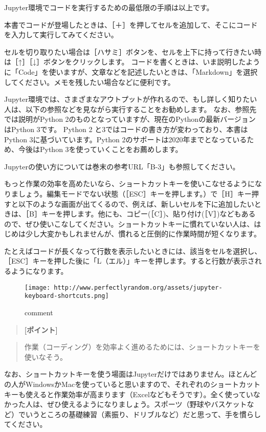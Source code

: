 \documentclass[11pt]{article}
\makeatletter
\def\maxwidth{\ifdim\Gin@nat@width>\linewidth\linewidth
    \else\Gin@nat@width\fi}
\let\Oldincludegraphics\includegraphics
\renewcommand{\includegraphics}[1]{\Oldincludegraphics[width=.8\maxwidth]{#1}}
\makeatother
\begin{document}
    Jupyter環境でコードを実行するための最低限の手順は以上です。

本書でコードが登場したときは、［＋］を押してセルを追加して、そこにコードを入力して実行してみてください。

セルを切り取りたい場合は［ハサミ］ボタンを、セルを上下に持って行きたい時は［↑］［↓］ボタンをクリックします。
コードを書くときは、いま説明したように「Code」を使いますが、文章などを記述したいときは、「Markdown」を選択してください。メモを残したい場合などに便利です。

Jupyter環境では、さまざまなアウトプットが作れるので、もし詳しく知りたい人は、以下の参照などを見ながら実行することをお勧めします。
なお、参照先では説明がPython
2のものとなっていますが、現在のPythonの最新バージョンはPython 3です。
Python 2 と3ではコードの書き方が変わっており、本書はPython
3に基づいています。Python
2のサポートは2020年までとなっているため、今後はPython
3を使っていくことをお薦めします。

Jupyterの使い方については巻末の参考URL「B-3」も参照してください。

    もっと作業の効率を高めたいなら、ショートカットキーを使いこなせるようになりましょう。編集モードでない状態（［ESC］キーを押します。）で［H］キー押すと以下のような画面が出てくるので、例えば、新しいセルを下に追加したいときは、［B］キーを押します。他にも、コピー(［C］)、貼り付け(［V］)などもあるので、ぜひ使いこなしてください。ショートカットキーに慣れていない人は、はじめは少し大変かもしれませんが、慣れると圧倒的に作業時間が短くなります。

たとえばコードが長くなって行数を表示したいときには、該当をセルを選択し、［ESC］キーを押した後に「L（エル）」キーを押します。すると行数が表示されるようになります。

    \begin{figure}
\centering
\texttt{[image: http://www.perfectlyrandom.org/assets/jupyter-keyboard-shortcuts.png]}
\caption{comment}
\end{figure}

    \begin{quote}
\textbf{{[}ポイント{]}}
\end{quote}

\begin{quote}
作業（コーディング）を効率よく進めるためには、ショートカットキーを使いなそう。
\end{quote}

    なお、ショートカットキーを使う場面はJupyterだけではありません。ほとんどの人がWindowsかMacを使っていると思いますので、それぞれのショートカットキーも使えると作業効率が高まります（Excelなどもそうです）。全く使っていなかった人は、ぜひ使えるようになりましょう。スポーツ（野球やバスケットなど）でいうところの基礎練習（素振り、ドリブルなど）だと思って、手を慣らしてください。
\end{document}
